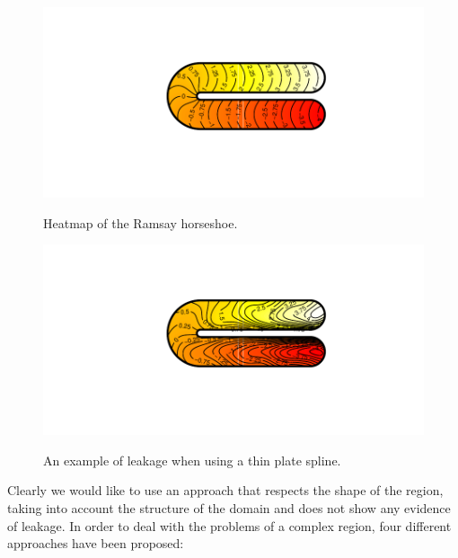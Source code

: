 \documentclass[a4paper,10pt]{amsart}
\begin{document}
\begin{figure}
\centering
\includegraphics[trim=0.5in 1in 0in 1in]{figs/ramsayhorseshoe.pdf} \\
\caption{Heatmap of the Ramsay horseshoe.}
\label{ramsayshorseshoe}
\end{figure}

\begin{figure}
\centering
\includegraphics[trim=0.5in 1in 0in 1in]{figs/leakageexample.pdf} \\
\caption{An example of leakage when using a thin plate spline.}
\label{tpleakage}
\end{figure}

Clearly we would like to use an approach that respects the shape of the region, taking into account the structure of the domain and does not show any evidence of leakage. In order to deal with the problems of a complex region, four different approaches have been proposed:
\end{document}
